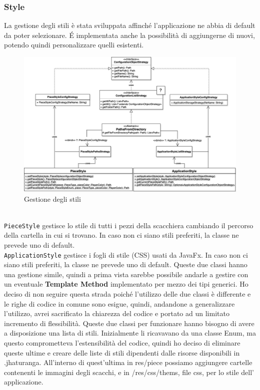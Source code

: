 \documentclass[a4paper,12pt]{report}
\begin{document}
\subsubsection*{Style}
La gestione degli stili è stata sviluppata affinché l'applicazione ne abbia di default da poter selezionare. É implementata anche la possibilità di aggiungerne di nuovi, potendo quindi personalizzare quelli esistenti.
\begin{figure}[H]
    \begin{center}
        \centering
        \includegraphics[width=\textwidth]{img/Tommaso/style.png}
    \end{center}
    \caption{Gestione degli stili}
    \label{img:style}
\end{figure}
\
\\
%
\texttt{PieceStyle} gestisce lo stile di tutti i pezzi della scacchiera cambiando il percorso della cartella in cui si trovano. 
In caso non ci siano stili preferiti, la classe ne prevede uno di default.
\\
\texttt{ApplicationStyle} gestisce i fogli di stile (CSS) usati da JavaFx.
In caso non ci siano stili preferiti, la classe ne prevede uno di default.
Queste due classi hanno una gestione simile, quindi a prima vista sarebbe possibile andarle a gestire con un eventuale \textbf{Template Method} implementato per mezzo dei tipi generici. Ho deciso di non seguire questa strada poiché l'utilizzo delle due classi è differente e le righe di codice in comune sono esigue, quindi, andandone a generalizzare l'utilizzo, avrei sacrificato la chiarezza del codice e portato ad un limitato incremento di flessibilità.
Queste due classi per funzionare hanno bisogno di avere a disposizione una lista di stili.
Inizialmente li ricavavano da una classe Enum, ma questo comprometteva l'estensibilità del codice, quindi ho deciso di eliminare queste ultime e creare delle liste di stili dipendenti dalle risorse disponibili in .jhaturanga.
All'interno di quest'ultima in res/piece possiamo aggiungere cartelle contenenti le immagini degli scacchi, e in /res/css/thems, file css, per lo stile dell' applicazione.
\end{document}
